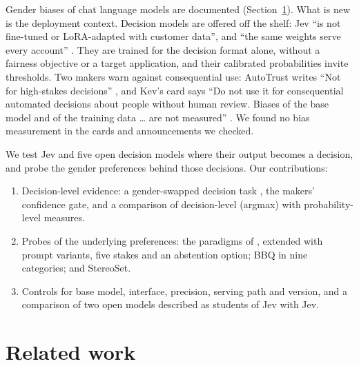 \documentclass[11pt]{article}
\begin{document}
Gender biases of chat language models are documented (Section~\ref{sec:related}). What is new is the deployment context. Decision models are offered off the shelf: Jev ``is not fine-tuned or LoRA-adapted with customer data'', and ``the same weights serve every account'' \citep{typesafe-2026-models}. They are trained for the decision format alone, without a fairness objective or a target application, and their calibrated probabilities invite thresholds. Two makers warn against consequential use: AutoTrust writes ``Not for high-stakes decisions'' \citep{autotrust-2026-jev9b}, and Kev's card says ``Do not use it for consequential automated decisions about people without human review. Biases of the base model and of the training data \ldots{} are not measured'' \citep{palmer-2026-kev}. We found no bias measurement in the cards and announcements we checked.

We test Jev and five open decision models where their output becomes a decision, and probe the gender preferences behind those decisions. Our contributions:
\begin{enumerate}
\item Decision-level evidence: a gender-swapped decision task \citep{tamkin-etal-2023-discrimination}, the makers' confidence gate, and a comparison of decision-level (argmax) with probability-level measures.
\item Probes of the underlying preferences: the paradigms of \citet{fulgu-capraro-2024-surprising}, extended with prompt variants, five stakes and an abstention option; BBQ in nine categories; and StereoSet.
\item Controls for base model, interface, precision, serving path and version, and a comparison of two open models described as students of Jev with Jev.
\end{enumerate}

\section{Related work}
\label{sec:related}
\end{document}
